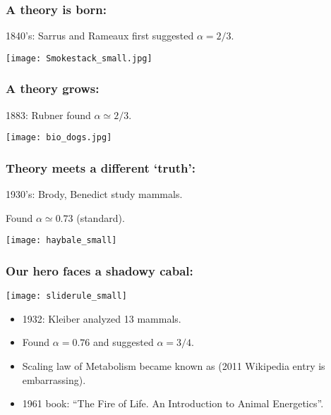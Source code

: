 \begin{frame}
  \frametitle{A theory is born:}

  1840's: Sarrus and Rameaux\cite{sarrus1838a} first suggested $\alpha=2/3$.

  \begin{center}
    \texttt{[image: Smokestack\_small.jpg]}
  \end{center}

\end{frame}

\begin{frame}
  \frametitle{A theory grows:}

  1883: Rubner\cite{rubner1883a} found $\alpha \simeq 2/3$.

  \begin{center}
    \texttt{[image: bio\_dogs.jpg]}
  \end{center}

\end{frame}

\begin{frame}
  \frametitle{Theory meets a different `truth':}

  1930's: Brody, Benedict study mammals.\cite{brody1945a}

  Found $\alpha \simeq 0.73 $ (standard).

  \begin{center}
    \texttt{[image: haybale\_small]}
  \end{center}

\end{frame}

\begin{frame}
  \frametitle{Our hero faces a shadowy cabal:}

  \begin{center}
    \texttt{[image: sliderule\_small]}
  \end{center}

  \begin{itemize}
  \item
  1932: Kleiber analyzed 13 mammals.\cite{kleiber1932a}
  \item 
  Found $\alpha=0.76$ and suggested $\alpha=3/4$.
  \item<+-> 
    Scaling law of Metabolism became
    known as 
     (2011 Wikipedia entry is embarrassing).
  \item<+-> 
    1961 book: ``The Fire of Life.  An Introduction to Animal Energetics''.\cite{kleiber1961a}
  \end{itemize}

\end{frame}

